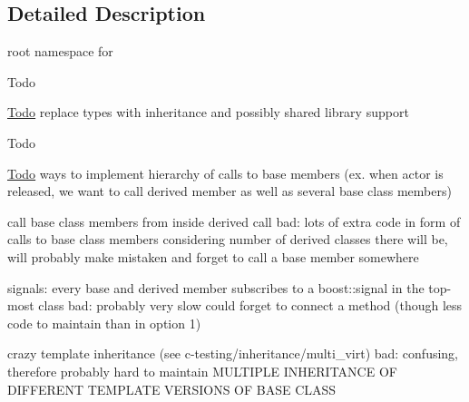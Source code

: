 \subsection{Detailed Description}
root namespace for  \begin{DoxyRefDesc}{Todo}
\item[\hyperlink{todo__todo000019}{Todo}]replace types with inheritance and possibly shared library support \end{DoxyRefDesc}


\begin{DoxyRefDesc}{Todo}
\item[\hyperlink{todo__todo000020}{Todo}]ways to implement hierarchy of calls to base members (ex. when actor is released, we want to call derived member as well as several base class members)\end{DoxyRefDesc}



\begin{DoxyEnumerate}
\item call base class members from inside derived call bad\-: lots of extra code in form of calls to base class members considering number of derived classes there will be, will probably make mistaken and forget to call a base member somewhere
\item signals\-: every base and derived member subscribes to a boost\-::signal in the top-\/most class bad\-: probably very slow could forget to connect a method (though less code to maintain than in option 1)
\item crazy template inheritance (see c-\/testing/inheritance/multi\-\_\-virt) bad\-: confusing, therefore probably hard to maintain M\-U\-L\-T\-I\-P\-L\-E I\-N\-H\-E\-R\-I\-T\-A\-N\-C\-E O\-F D\-I\-F\-F\-E\-R\-E\-N\-T T\-E\-M\-P\-L\-A\-T\-E V\-E\-R\-S\-I\-O\-N\-S O\-F B\-A\-S\-E C\-L\-A\-S\-S 
\end{DoxyEnumerate}